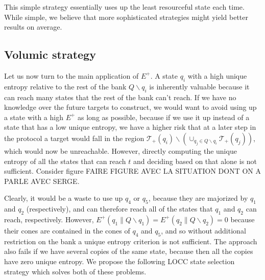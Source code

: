 This simple strategy essentially uses up the least resourceful state each time. While simple, we believe that more sophisticated strategies might yield better results on average.



\subsection{Volumic strategy}

Let us now turn to the main application of $E^+$. A state $q_i$ with a high unique entropy relative to the rest of the bank $Q \backslash q_i$ is inherently valuable because it can reach many states that the rest of the bank can't reach. If we have no knowledge over the future targets to construct, we would want to avoid using up a state with a high $E^+$ as long as possible, because if we use it up instead of a state that has a low unique entropy, we have a higher risk that at a later step in the protocol a target would fall in the region
$\mathcal{T}_+(q_i) \backslash \left(\cup_{q_j \in Q \backslash q_i} \mathcal{T}_+(q_j)\right)$, which would now be unreachable. However, directly computing the unique entropy of all the states that can reach $t$ and deciding based on that alone is not sufficient. Consider figure FAIRE FIGURE AVEC LA SITUATION DONT ON A PARLE AVEC SERGE. 

Clearly, it would be a waste to use up $q_4$ or $q_5$, because they are majorized by $q_1$ and $q_2$ (respectively), and can therefore reach all of the states that $q_1$ and $q_2$ can reach, respectively. However, $E^+(q_1 \parallel Q \backslash q_1) = E^+(q_2 \parallel Q \backslash q_2) = 0$ because their cones are contained in the cones of $q_4$ and $q_5$, and so without additional restriction on the bank a unique entropy criterion is not sufficient. The approach also fails if we have several copies of the same state, because then all the copies have zero unique entropy. We propose the following LOCC state selection strategy which solves both of these problems.

